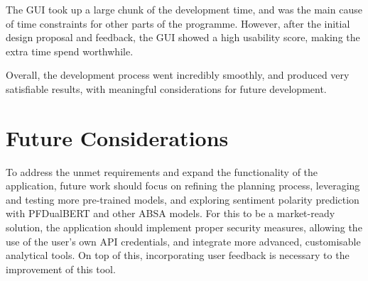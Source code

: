 The GUI took up a large chunk of the development time, and was the main cause of time constraints for other parts of the programme. However, after the initial design proposal and feedback, the GUI showed a high usability score, making the extra time spend worthwhile.

Overall, the development process went incredibly smoothly, and produced very satisfiable results, with meaningful considerations for future development.

\section{Future Considerations}
To address the unmet requirements and expand the functionality of the application, future work should focus on refining the planning process, leveraging and testing more pre-trained models, and exploring sentiment polarity prediction with PFDualBERT and other ABSA models. For this to be a market-ready solution, the application should implement proper security measures, allowing the use of the user's own API credentials, and integrate more advanced, customisable analytical tools. On top of this, incorporating user feedback is necessary to the improvement of this tool.
